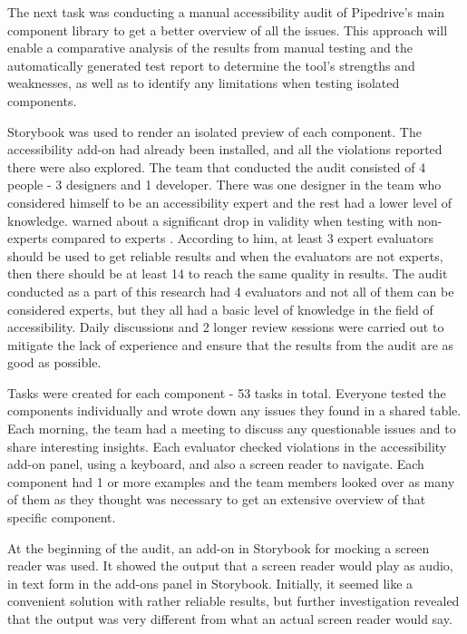 \documentclass{master_thesis}
\begin{document}
The next task was conducting a manual accessibility audit of Pipedrive's main component library to get a better overview of all the issues. This approach will enable a comparative analysis of the results from manual testing and the automatically generated test report to determine the tool's strengths and weaknesses, as well as to identify any limitations when testing isolated components.

Storybook was used to render an isolated preview of each component. The accessibility add-on had already been installed, and all the violations reported there were also explored. The team that conducted the audit consisted of 4 people - 3 designers and 1 developer.
There was one designer in the team who considered himself to be an accessibility expert and the rest had a lower level of knowledge. \citeauthor{Brajnik2011} warned about a significant drop in validity when testing with non-experts compared to experts \citep{Brajnik2011}. According to him, at least 3 expert evaluators should be used to get reliable results and when the evaluators are not experts, then there should be at least 14 to reach the same quality in results. The audit conducted as a part of this research had 4 evaluators and not all of them can be considered experts, but they all had a basic level of knowledge in the field of accessibility. Daily discussions and 2 longer review sessions were carried out to mitigate the lack of experience and ensure that the results from the audit are as good as possible.

Tasks were created for each component - 53 tasks in total. Everyone tested the components individually and wrote down any issues they found in a shared table. Each morning, the team had a meeting to discuss any questionable issues and to share interesting insights. Each evaluator checked violations in the accessibility add-on panel, using a keyboard, and also a screen reader to navigate. Each component had 1 or more examples and the team members looked over as many of them as they thought was necessary to get an extensive overview of that specific component.

At the beginning of the audit, an add-on in Storybook for mocking a screen reader \citep{Lara} was used. It showed the output that a screen reader would play as audio, in text form in the add-ons panel in Storybook. Initially, it seemed like a convenient solution with rather reliable results, but further investigation revealed that the output was very different from what an actual screen reader would say.
\end{document}
